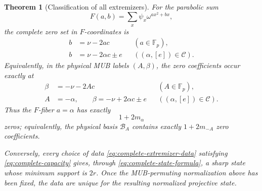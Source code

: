 \documentclass[11pt]{article}
\newtheorem{theorem}{Theorem}[section]
\newcommand{\F}{\mathbb F}
\begin{document}
\begin{theorem}[Classification of all extremizers]
For the parabolic sum
\[
 F(a,b)=\sum_x\psi_x\omega^{a x^2+b x},
\]
the complete zero set in \(F\)-coordinates is
\begin{equation}
 \boxed{
 \begin{aligned}
 b&=\nu-2ac
 &&(a\in\F_p),\\
 b&=\nu-2\alpha c\pm e
 &&((\alpha,[e])\in\mathcal C).
 \end{aligned}}
 \label{eq:complete-zero-set}
\end{equation}
Equivalently, in the physical MUB labels \((A,\beta)\), the zero
coefficients occur exactly at
\begin{equation}
 \boxed{
 \begin{aligned}
 \beta&=-\nu-2Ac
 &&(A\in\F_p),\\
 A&=-\alpha,\qquad
 \beta=-\nu+2\alpha c\pm e
 &&((\alpha,[e])\in\mathcal C).
 \end{aligned}}
 \label{eq:complete-physical-zero-set}
\end{equation}
Thus the \(F\)-fiber \(a=\alpha\) has exactly
\[
 1+2m_\alpha
\]
zeros; equivalently, the physical basis \(\mathcal B_A\) contains exactly
\(1+2m_{-A}\) zero coefficients.

Conversely, every choice of data
\eqref{eq:complete-extremizer-data} satisfying
\eqref{eq:complete-capacity} gives, through
\eqref{eq:complete-state-formula}, a sharp state whose minimum support
is \(2r\).  Once the MUB-permuting normalization above has been fixed,
the data are unique for the resulting normalized projective state.
\end{theorem}
\end{document}
